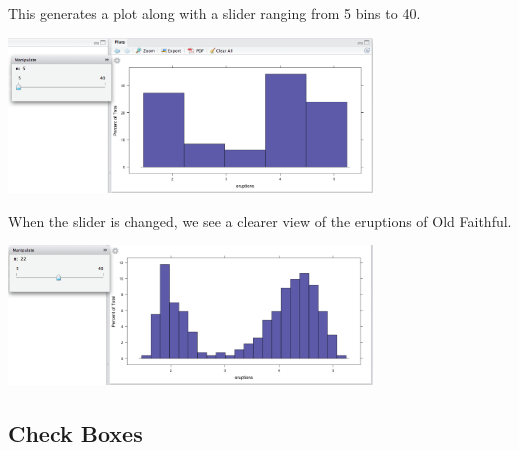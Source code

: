 This generates a plot along with a slider ranging from 5 bins to 40.

\begin{center}
\includegraphics[width=3.8in]{images/manip-hist1.png}
\end{center}

When the slider is changed, we see a clearer view of the eruptions of Old Faithful.

\centerline{\includegraphics[width=3.8in]{images/manip-hist2.png}}



\subsection{Check Boxes}

